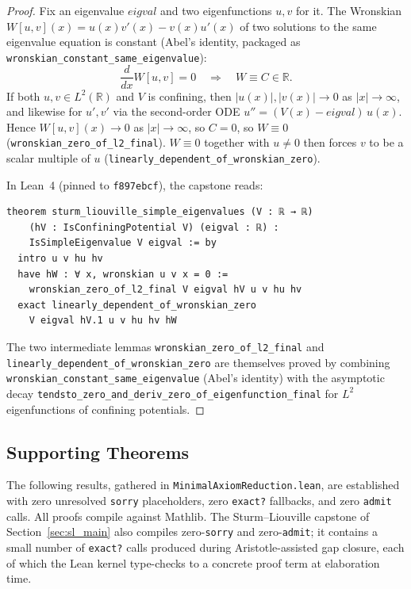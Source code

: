 \documentclass[12pt, a4paper]{article}
\theoremstyle{plain}
\theoremstyle{definition}
\newcommand{\R}{\mathbb{R}}
\newcommand{\lean}[1]{\texttt{#1}}
\newcommand{\Aristotle}{\textsf{Aristotle}}
\begin{document}
\begin{proof}
Fix an eigenvalue $\mathit{eigval}$ and two eigenfunctions $u, v$ for it.
The Wronskian $W[u,v](x) = u(x)v'(x) - v(x)u'(x)$ of two solutions to
the same eigenvalue equation is constant (Abel's identity, packaged as
\lean{wronskian\_constant\_same\_eigenvalue}):
\[
  \frac{d}{dx} W[u,v] = 0 \quad \Longrightarrow \quad W \equiv C \in \R.
\]
If both $u, v \in L^2(\R)$ and $V$ is confining, then
$|u(x)|, |v(x)| \to 0$ as $|x| \to \infty$, and likewise for $u', v'$
via the second-order ODE
$u'' = (V(x) - \mathit{eigval})\, u(x)$.
Hence $W[u,v](x) \to 0$ as $|x| \to \infty$, so $C = 0$, so $W \equiv 0$
(\lean{wronskian\_zero\_of\_l2\_final}).
$W \equiv 0$ together with $u \neq 0$ then forces $v$ to be a scalar
multiple of $u$ (\lean{linearly\_dependent\_of\_wronskian\_zero}).

In Lean~4 (pinned to \texttt{f897ebcf}), the capstone reads:
\begin{lstlisting}[language=Lean4]
theorem sturm_liouville_simple_eigenvalues (V : ℝ → ℝ)
    (hV : IsConfiningPotential V) (eigval : ℝ) :
    IsSimpleEigenvalue V eigval := by
  intro u v hu hv
  have hW : ∀ x, wronskian u v x = 0 :=
    wronskian_zero_of_l2_final V eigval hV u v hu hv
  exact linearly_dependent_of_wronskian_zero
    V eigval hV.1 u v hu hv hW
\end{lstlisting}
The two intermediate lemmas \lean{wronskian\_zero\_of\_l2\_final} and
\lean{linearly\_dependent\_of\_wronskian\_zero} are themselves proved
by combining \lean{wronskian\_constant\_same\_eigenvalue} (Abel's
identity) with the asymptotic decay
\lean{tendsto\_zero\_and\_deriv\_zero\_of\_eigenfunction\_final} for
$L^2$ eigenfunctions of confining potentials.
\end{proof}

\subsection{Supporting Theorems}
\label{sec:supporting_thms}

The following results, gathered in \lean{MinimalAxiomReduction.lean},
are established with zero unresolved \lean{sorry} placeholders, zero
\lean{exact?} fallbacks, and zero \lean{admit} calls.
All proofs compile against Mathlib.
The Sturm--Liouville capstone of Section~\ref{sec:sl_main} also compiles
zero-\lean{sorry} and zero-\lean{admit}; it contains a small number of
\lean{exact?} calls produced during \Aristotle{}-assisted gap closure,
each of which the Lean kernel type-checks to a concrete proof term at
elaboration time.
\end{document}
